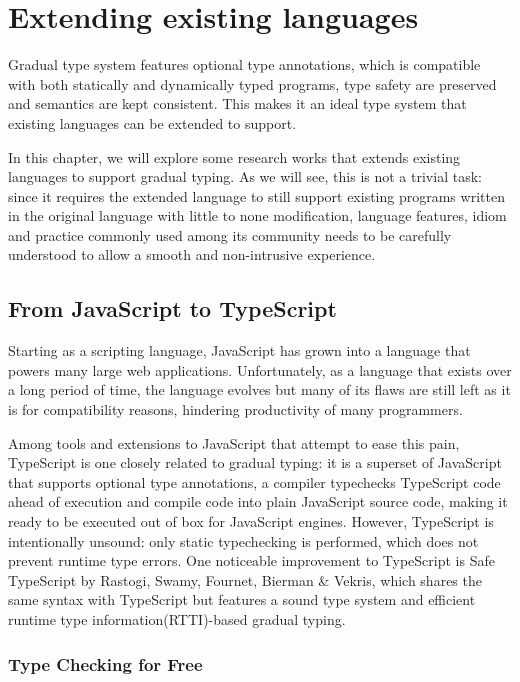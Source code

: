 
\renewcommand{\thechapter}{2}

\chapter{Extending existing languages}

Gradual type system features optional type annotations,
which is compatible with both statically and dynamically typed programs,
type safety are preserved and semantics are kept consistent.
This makes it an ideal type system that
existing languages can be extended to support.

In this chapter, we will explore some research works that extends existing languages
to support gradual typing. As we will see, this is not a trivial task:
since it requires the extended language to still support existing programs written
in the original language with little to none modification,
language features, idiom and practice commonly used among its community
needs to be carefully understood to allow a smooth and non-intrusive experience.

\section{From JavaScript to TypeScript}

Starting as a scripting language, JavaScript has grown into a language
that powers many large web applications.
Unfortunately, as a language that exists over a long period of time,
the language evolves but many of its flaws are still left as it is for compatibility reasons,
hindering productivity of many programmers.

Among tools and extensions to JavaScript that attempt to ease this pain,
TypeScript is one closely related to gradual typing:
it is a superset of JavaScript that supports optional type annotations,
a compiler typechecks TypeScript code ahead of execution and compile code
into plain JavaScript source code, making it ready to be executed out of box
for JavaScript engines.
However, TypeScript is intentionally unsound: only static typechecking is performed,
which does not prevent runtime type errors.
One noticeable improvement to TypeScript is Safe TypeScript by Rastogi, Swamy, Fournet, Bierman \& Vekris, which shares the same syntax with TypeScript
but features a sound type system and efficient runtime type information(RTTI)-based
gradual typing.

\subsection{Type Checking for Free}

